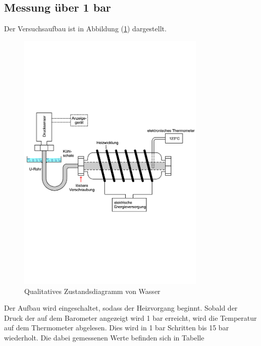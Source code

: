 \subsection{Messung über 1 bar}
Der Versuchsaufbau ist in Abbildung (\ref{fig:aufbau2}) dargestellt.

\begin{figure}
    \centering
    \includegraphics[width=9cm]{aufbau2.pdf}
    \caption{Qualitatives Zustandsdiagramm von Wasser \cite{V203}}
    \label{fig:aufbau2}
  \end{figure}

\noindent
Der Aufbau wird eingeschaltet, sodass der Heizvorgang beginnt.
Sobald der Druck der auf dem Barometer angezeigt wird 1 bar erreicht, 
wird die Temperatur auf dem Thermometer abgelesen.
Dies wird in 1 bar Schritten bis 15 bar wiederholt.
Die dabei gemessenen Werte befinden sich in Tabelle %
